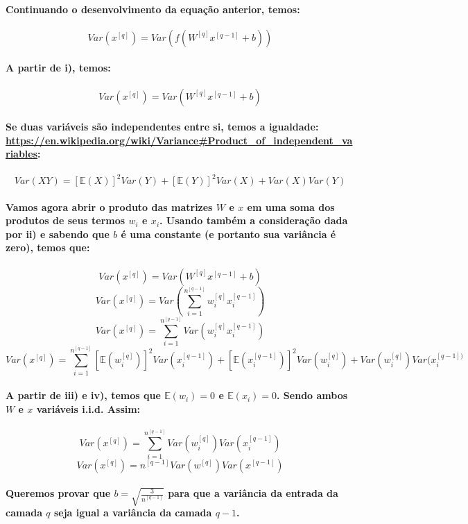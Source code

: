 \documentclass[a4paper]{article}    %
\begin{document}
\paragraph{Continuando o desenvolvimento da equação anterior, temos:}
\[Var(x^{[q]}) = Var(f(W^{[q]} x^{[q-1]} + b))\]

\paragraph{A partir de i), temos:}
\[Var(x^{[q]}) = Var(W^{[q]} x^{[q-1]} + b)\]

\paragraph{Se duas variáveis são independentes entre si, temos a igualdade:\\
\href{https://en.wikipedia.org/wiki/Variance\#Product_of_independent_variables}{https://en.wikipedia.org/wiki/Variance\#Product\_of\_independent\_variables}:}
\[Var(XY) = [\mathbb{E}(X)]^2 Var(Y) + [\mathbb{E}(Y)]^2 Var(X) + Var(X)Var(Y)\]

\paragraph{Vamos agora abrir o produto das matrizes $W$ e $x$ em uma soma dos produtos de seus termos  $w_i$ e $x_i$. Usando também a consideração dada por ii) e sabendo que $b$ é uma constante (e portanto sua variância é zero), temos que:}
\[Var(x^{[q]}) = Var(W^{[q]} x^{[q-1]} + b)\]
\[Var(x^{[q]}) = Var(\sum_{i=1}^{n^{[q-1]}} w_i^{[q]} x_i^{[q-1]})\]
\[Var(x^{[q]}) = \sum_{i=1}^{n^{[q-1]}} Var(w_i^{[q]} x_i^{[q-1]})\]
\[Var(x^{[q]}) = \sum_{i=1}^{n^{[q-1]}}[\mathbb{E}(w_i^{[q]})]^2 Var(x_i^{[q-1]}) + [\mathbb{E}(x_i^{[q-1]})]^2 Var(w_i^{[q]}) + Var(w_i^{[q]})Var(x_i^{[q-1])}\]

\paragraph{A partir de iii) e iv), temos que $\mathbb{E}(w_i) = 0$ e $\mathbb{E}(x_i) = 0$. Sendo ambos $W$ e $x$ variáveis i.i.d. Assim:}
\[Var(x^{[q]}) = \sum_{i=1}^{n^{[q-1]}} Var(w_i^{[q]})Var(x_i^{[q-1]})\]
\[\boxed{Var(x^{[q]}) = n^{[q-1]} Var(w^{[q]})Var(x^{[q-1]})}\]

\paragraph{Queremos provar que $b = \sqrt{\frac{3}{n^{[q-1]}}}$ para que a variância da entrada da camada $q$ seja igual a variância da camada $q-1$.}
\end{document}

